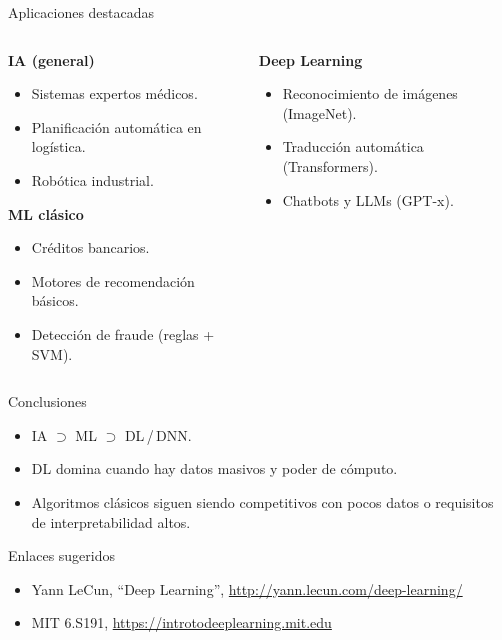 \documentclass[12pt,spanish]{beamer}
\begin{document}
\begin{frame}{Aplicaciones destacadas}
  \begin{columns}[T]
    \begin{column}{.48\textwidth}
      \textbf{IA (general)}
      \begin{itemize}
        \item Sistemas expertos médicos.
        \item Planificación automática en logística.
        \item Robótica industrial.
      \end{itemize}
      \vspace{.5em}
      \textbf{ML clásico}
      \begin{itemize}
        \item Créditos bancarios.
        \item Motores de recomendación básicos.
        \item Detección de fraude (reglas + SVM).
      \end{itemize}
    \end{column}
    \begin{column}{.48\textwidth}
      \textbf{Deep Learning}
      \begin{itemize}
        \item Reconocimiento de imágenes (ImageNet).
        \item Traducción automática (Transformers).
        \item Chatbots y LLMs (GPT-x).
      \end{itemize}
    \end{column}
  \end{columns}
\end{frame}

\begin{frame}{Conclusiones}
  \begin{itemize}
    \item IA \(\supset\) ML \(\supset\) DL / DNN.
    \item DL domina cuando hay datos masivos y poder de cómputo.
    \item Algoritmos clásicos siguen siendo competitivos con pocos datos o
          requisitos de interpretabilidad altos.
  \end{itemize}
  \begin{block}{Enlaces sugeridos}
    \begin{itemize}
      \item Yann LeCun, “Deep Learning”, \url{http://yann.lecun.com/deep-learning/}
      \item MIT 6.S191, \url{https://introtodeeplearning.mit.edu}
    \end{itemize}
  \end{block}
\end{frame}
\end{document}
